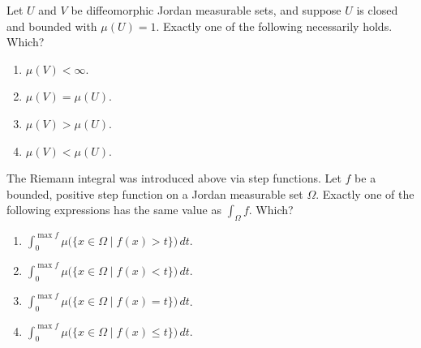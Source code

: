 \begin{exercise}
\label{ex:kobel_diffeomorphic_jordan_measure}
Let $U$ and $V$ be diffeomorphic Jordan measurable sets, and suppose $U$ is closed and bounded
with $\mu(U) = 1$. Exactly one of the following necessarily holds. Which?
\begin{enumerate}[label=\textbf{(\alph*)}]
  \item $\mu(V) < \infty$.
  \item $\mu(V) = \mu(U)$.
  \item $\mu(V) > \mu(U)$.
  \item $\mu(V) < \mu(U)$.
\end{enumerate}
\end{exercise}

\begin{exercise}
\label{ex:kobel_layer_cake}
The Riemann integral was introduced above via step functions. Let $f$ be a bounded, positive step
function on a Jordan measurable set $\Omega$. Exactly one of the following expressions has the
same value as $\int_\Omega f$. Which?
\begin{enumerate}[label=\textbf{(\alph*)}]
  \item $\displaystyle\int_0^{\max f}\mu\big(\{x \in \Omega \mid f(x) > t\}\big)\,dt$.
  \item $\displaystyle\int_0^{\max f}\mu\big(\{x \in \Omega \mid f(x) < t\}\big)\,dt$.
  \item $\displaystyle\int_0^{\max f}\mu\big(\{x \in \Omega \mid f(x) = t\}\big)\,dt$.
  \item $\displaystyle\int_0^{\max f}\mu\big(\{x \in \Omega \mid f(x) \le t\}\big)\,dt$.
\end{enumerate}
\end{exercise}
